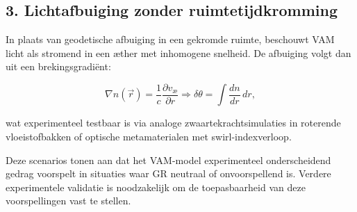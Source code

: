 \subsection*{3. Lichtafbuiging zonder ruimtetijdkromming}

In plaats van geodetische afbuiging in een gekromde ruimte, beschouwt VAM licht als stromend in een æther met inhomogene snelheid. De afbuiging volgt dan uit een brekingsgradiënt:

\begin{equation}
    \nabla n(\vec{r}) = \frac{1}{c} \frac{\partial v_\text{\ae}}{\partial r} \Rightarrow \delta \theta = \int \frac{dn}{dr} \, dr,
    \label{eq:light_bending}
\end{equation}

wat experimenteel testbaar is via analoge zwaartekrachtsimulaties in roterende vloeistofbakken of optische metamaterialen met swirl-indexverloop.

\bigskip

Deze scenario\rqs s tonen aan dat het VAM-model experimenteel onderscheidend gedrag voorspelt in situaties waar GR neutraal of onvoorspellend is. Verdere experimentele validatie is noodzakelijk om de toepasbaarheid van deze voorspellingen vast te stellen.